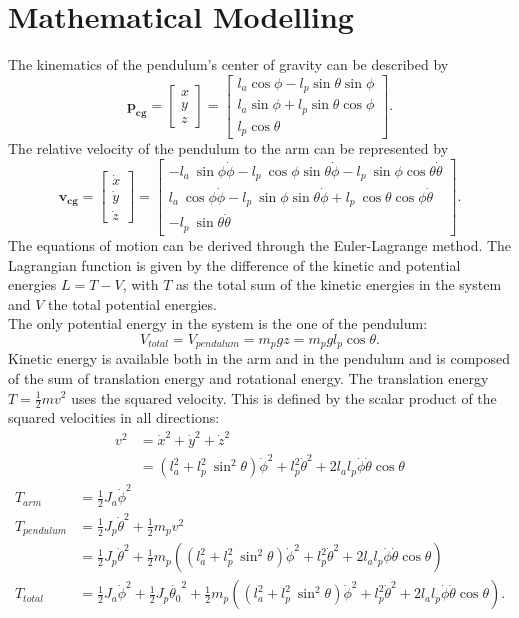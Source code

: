 \section{Mathematical Modelling} 
The kinematics of the pendulum's 
center of gravity can be described by 
\[\mathbf{p_{cg}}=\begin{bmatrix}
x	\\ 
y	\\ 
z	
	\end{bmatrix} =\begin{bmatrix}
l_a\cos\phi-l_{p}\sin\theta\sin\phi \\ 
l_a\sin\phi+l_{p}\sin\theta\cos\phi \\ 
l_{p}\cos\theta
\end{bmatrix}. \] 
The relative velocity of the pendulum to the arm can be represented by 
\[\mathbf{v_{cg}}= \begin{bmatrix}
\dot{x}\\
\dot{y}\\
\dot{z}\end{bmatrix}=\begin{bmatrix}
-l_a\ \sin \phi \dot{\phi}-l_{p}\ \cos\phi \sin\theta\dot{\phi}-l_{p} 
\ \sin\phi \cos\theta\dot{\theta} \\ 
l_a\ \cos\phi\dot{\phi}-l_{p} \ \sin\phi \sin\theta\dot{\phi}+l_{p} 
\ \cos\theta \cos\phi\dot{\theta} \\
-l_{p} \ \sin\theta\dot{\theta}
\end{bmatrix}.\]
The equations of motion can be derived through the Euler-Lagrange 
method. The Lagrangian function is given by the difference of the 
kinetic and potential energies $L=T-V$, with $T$ as the total sum of the 
kinetic energies in the system and $V$ the total potential energies.\\
The only potential energy in the system is the one of the pendulum:
\[V_{total}=V_{pendulum}=m_pgz= m_pgl_{p}\cos\theta.\]
Kinetic energy is available both in the arm and in the pendulum and is composed 
of the sum of translation energy and rotational energy. The translation 
energy $T=\frac{1}{2}mv^2$ uses the squared velocity. This is defined by  the 
scalar product 
of the squared velocities in all directions:
\begin{align*}v^2&=\dot{x}^2+\dot{y}^2+\dot{z}^2\\
&=(l_a^2+l_p^2\ 
\sin^2\theta)\dot{\phi}^2+l_p^2\dot{\theta}^2+2l_al_p\dot{\phi}\dot{\theta}\cos 
\theta\end{align*} 
\begin{align*}
T_{arm}&=\frac{1}{2}J_a\dot{\phi}^2\\
T_{pendulum}&=\frac{1}{2}J_p\dot{\theta}^2+\frac{1}{2}m_pv^2\\
&= \frac{1}{2}J_p\dot{\theta}^2+\frac{1}{2}m_p\left((l_a^2+l_p^2\ 
\sin^2\theta)\dot{\phi}^2+l_p^2\dot{\theta}^2+2l_al_p\dot{\phi}\dot{\theta}\cos 
\theta\right)\\
T_{total}&= 
\frac{1}{2}J_a\dot{\phi}^2+\frac{1}{2}J_p\dot{\theta_0}^2+\frac{1}{2}m_p\left((l_a^2+l_p^2\
\sin^2\theta)\dot{\phi}^2+l_p^2\dot{\theta}^2+2l_al_p\dot{\phi}\dot{\theta}\cos 
\theta\right).
\end{align*}
